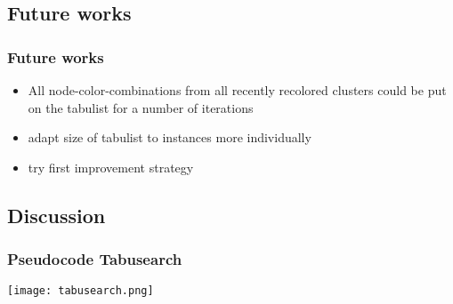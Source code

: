 \documentclass{beamer}
\begin{document}
\subsection{Future works}
\begin{frame}
\frametitle{Future works}
\begin{itemize}
\item All node-color-combinations from all recently recolored clusters could be put on the tabulist for a number of iterations
\item adapt size of tabulist to instances more individually
\item try first improvement strategy
\end{itemize}
\end{frame}

\subsection{Discussion}


\begin{frame}[fragile]
\frametitle{Pseudocode Tabusearch}
\texttt{[image: tabusearch.png]}
\end{frame}


\end{document}
